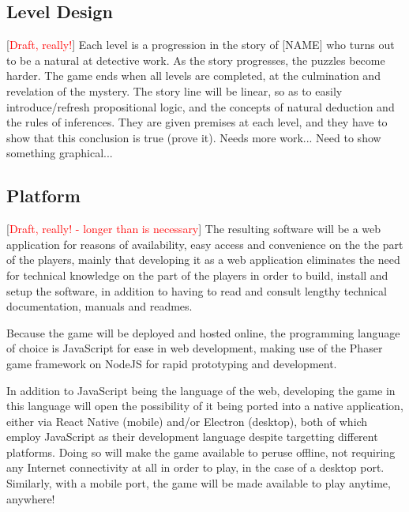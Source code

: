 \documentclass[a4paper]{article}
\newcommand{\comment}[1]{[\textcolor{red}{#1}]} %
\begin{document}
\subsection{Level Design}
\comment{Draft, really!} Each level is a progression in the story of [NAME] who turns out to be a natural at detective work. As the story progresses, the puzzles become harder. The game ends when all levels are completed, at the culmination and revelation of the mystery. The story line will be linear, so as to easily introduce/refresh propositional logic, and the concepts of natural deduction and the rules of inferences. They are given premises at each level, and they have to show that this conclusion is true (prove it). Needs more work... Need to show something graphical...


\subsection{Platform}
\comment{Draft, really! - longer than is necessary}  The resulting software will be a web application for reasons of availability, easy access and convenience on the the part of the players, mainly that developing it as a web application eliminates the need for technical knowledge on the part of the players in order to build, install and setup the software, in addition to having to read and consult lengthy technical documentation, manuals and readmes.

Because the game will be deployed and hosted online, the programming language of choice is JavaScript for ease in web development, making use of the Phaser game framework on NodeJS for rapid prototyping and development.

In addition to JavaScript being the language of the web, developing the game in this language will open the possibility of it being ported into a native application, either via React Native (mobile) and/or Electron (desktop), both of which employ JavaScript as their development language despite targetting different platforms. Doing so will make the game available to peruse offline, not requiring any Internet connectivity at all in order to play, in the case of a desktop port. Similarly, with a mobile port, the game will be made available to play anytime, anywhere!
\end{document}
